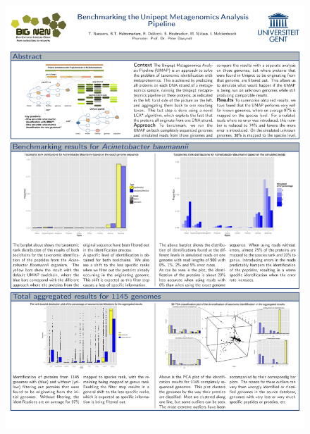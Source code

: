 \documentclass[twocolumn]{phdsymp}
\begin{document}
\begin{figure}[p]
	\centering
	\includegraphics[width=\textwidth]{includes/posterproject.pdf}
\end{figure}

\nocite{*}

\printbibliography
\end{document}

